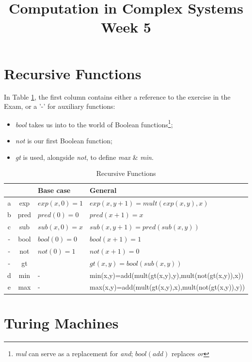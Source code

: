 \documentclass[]{article}
\title{Computation in Complex Systems\\
	Week 5
	}
\begin{document}
\maketitle

\section{Recursive Functions}

In Table \ref{table:recursive}, the first column contains either a reference to the exercise in the Exam, or a '-' for auxiliary functions:
\begin{itemize}
	\item \emph{bool} takes us into to the world of Boolean functions\footnote{\emph{mul} can serve as a replacement for \emph{and}; $bool(add)$ replaces \emph{or}};
	\item \emph{not} is our first Boolean function;
	\item \emph{gt} is used, alongside \emph{not}, to define \emph{max} \& \emph{min}.
\end{itemize}

\begin{table}[H]
	\caption{Recursive Functions}\label{table:recursive}
	\begin{tabular}{|c|c|l|l|}\hline
		&&Base case&General\\ \hline
		a&exp&$exp(x,0)=1$&$exp(x,y+1)=mult(exp(x,y),x)$\\ \hline
		b&pred&$pred(0)=0$&$pred(x+1) =x$\\ \hline
		c&sub&$sub(x, 0)=x $&$sub(x, y+1)=pred(sub(x,y)) $\\ \hline
		-&bool&$bool(0)=0$&$bool(x+1)=1$ \\ \hline
		-&not&$not(0)=1$&$not(x+1)=0$ \\ \hline
		-&gt&&$gt(x,y)=bool(sub(x,y))$\\ \hline
		d&min&-&min(x,y)=add(mult(gt(x,y),y),mult(not(gt(x,y)),x))\\ \hline
		e&max&-&max(x,y)=add(mult(gt(x,y),x),mult(not(gt(x,y)),y))\\ \hline
	\end{tabular}
\end{table}

\section{Turing Machines}
\end{document}
